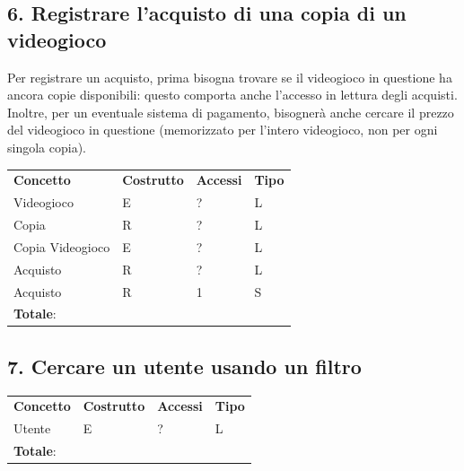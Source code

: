 \documentclass[a4paper,12pt]{report}
\begin{document}
\newpage

\subsection*{6. Registrare l'acquisto di una copia di un videogioco}

Per registrare un acquisto, prima bisogna trovare se il videogioco in questione ha ancora copie disponibili: questo comporta anche l'accesso in lettura degli acquisti. Inoltre, per un eventuale sistema di pagamento, bisognerà anche cercare il prezzo del videogioco in questione (memorizzato per l'intero videogioco, non per ogni singola copia).

\begin{table}[h!]
\begin{center}
	\begin{tabular}{ | m{4cm} P{4cm} P{4cm} P{4cm} | }
	 \textbf{Concetto} & \textbf{Costrutto} & \textbf{Accessi} & \textbf{Tipo} \\
	Videogioco		 & E & ? & L \\ \hline
	Copia			 & R & ? & L \\ \hline	
	Copia Videogioco & E & ? & L \\ \hline
	Acquisto 		 & R & ? & L \\ \hline
	Acquisto 		 & R & 1 & S \\ \hline
	 \textbf{Totale}: & & & \\ \hline
	\end{tabular}
\end{center}
\end{table}

\subsection*{7. Cercare un utente usando un filtro}

\begin{table}[h!]
\begin{center}
	\begin{tabular}{ | m{4cm} P{4cm} P{4cm} P{4cm} | }
	 \textbf{Concetto} & \textbf{Costrutto} & \textbf{Accessi} & \textbf{Tipo} \\
	Utente & E & ? & L \\ \hline
	 \textbf{Totale}: & & & \\ \hline
	\end{tabular}
\end{center}
\end{table}
\end{document}
